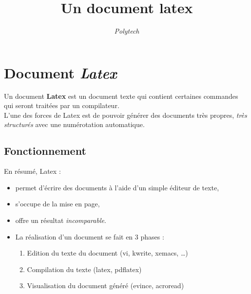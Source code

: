 \title{Un document latex}
\author{\textit{Polytech}}
\date{}


\maketitle

\section{Document \textit{Latex}}

Un document \textbf{Latex} est un document texte qui contient certaines
commandes qui seront traitées par un compilateur. \\
L'une des forces de Latex est de pouvoir générer des documents très 
propres, \textit{très structurés} avec une numérotation automatique.

\subsection{Fonctionnement}

En résumé, Latex :

\begin{itemize}
\item permet d'écrire des documents à l'aide d'un simple éditeur de texte,
\item s'occupe de la mise en page,
\item offre un résultat \textit{incomparable}. 
\item La réalisation d'un document se fait en 3 phases :
    \begin{enumerate}
\item Edition du texte du document (vi, kwrite, xemacs, \ldots)
    \item Compilation du texte (latex, pdflatex)
    \item Visualisation du document généré (evince, acroread)
    \end{enumerate}
\end{itemize}


